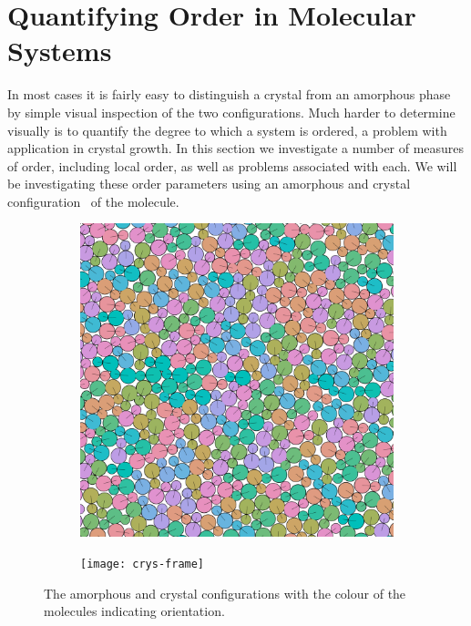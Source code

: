 \section{Quantifying Order in Molecular Systems}

In most cases it is fairly easy to distinguish a crystal from an amorphous phase by simple visual inspection of the two configurations. Much harder to determine visually is to quantify the degree to which a system is ordered, a problem with application in crystal growth. In this section we investigate a number of measures of order, including local order, as well as problems associated with each. We will be investigating these order parameters using an amorphous and crystal configuration~ of the \dcon molecule.

\begin{figure}
    \begin{subfigure}{0.5\textwidth}
        \includegraphics[width=\linewidth]{amorphous-frame}
        \caption{}
        \label{fig:amorphous frame}
    \end{subfigure}
    \begin{subfigure}{0.5\textwidth}
        \texttt{[image: crys-frame]}
        \caption{}
        \label{fig:crys frame}
    \end{subfigure}
    \caption{The amorphous  and crystal  configurations with the colour of the molecules indicating orientation.}
    \label{fig:frame comp}
\end{figure}


